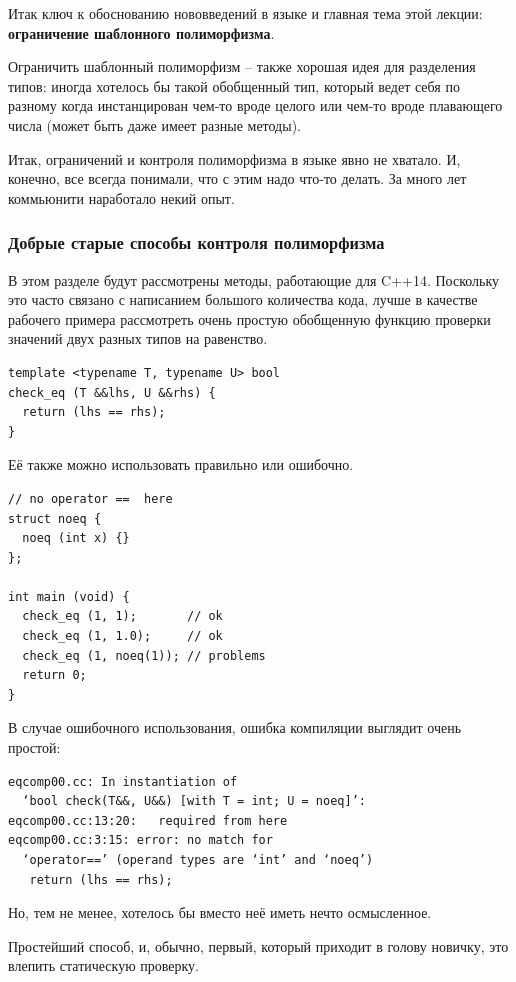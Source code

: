 \documentclass[a4paper,12pt,oneside]{article}
\begin{document}
Итак ключ к обоснованию нововведений в языке и главная тема этой лекции: \textbf{ограничение шаблонного полиморфизма}.

Ограничить шаблонный полиморфизм -- также хорошая идея для разделения типов: иногда хотелось бы такой обобщенный тип, который ведет себя по разному когда инстанцирован чем-то вроде целого или чем-то вроде плавающего числа (может быть даже имеет разные методы).

Итак, ограничений и контроля полиморфизма в языке явно не хватало. И, конечно, все всегда понимали, что с этим надо что-то делать. За много лет коммьюнити наработало некий опыт.

\subsubsection{Добрые старые способы контроля полиморфизма}

В этом разделе будут рассмотрены методы, работающие для C++14. Поскольку это часто связано с написанием большого количества кода, лучше в качестве рабочего примера рассмотреть очень простую обобщенную функцию проверки значений двух разных типов на равенство.

\begin{lstlisting}
template <typename T, typename U> bool
check_eq (T &&lhs, U &&rhs) {
  return (lhs == rhs);
}
\end{lstlisting}

Её также можно использовать правильно или ошибочно.

\begin{lstlisting}
// no operator ==  here
struct noeq {
  noeq (int x) {}
};

int main (void) {
  check_eq (1, 1);       // ok
  check_eq (1, 1.0);     // ok
  check_eq (1, noeq(1)); // problems
  return 0;
}
\end{lstlisting}

В случае ошибочного использования, ошибка компиляции выглядит очень простой:

\begin{verbatim}
eqcomp00.cc: In instantiation of 
  ‘bool check(T&&, U&&) [with T = int; U = noeq]’:
eqcomp00.cc:13:20:   required from here
eqcomp00.cc:3:15: error: no match for 
  ‘operator==’ (operand types are ‘int’ and ‘noeq’)
   return (lhs == rhs);
\end{verbatim}

Но, тем не менее, хотелось бы вместо неё иметь нечто осмысленное.

Простейший способ, и, обычно, первый, который приходит в голову новичку, это влепить статическую проверку.
\end{document}
